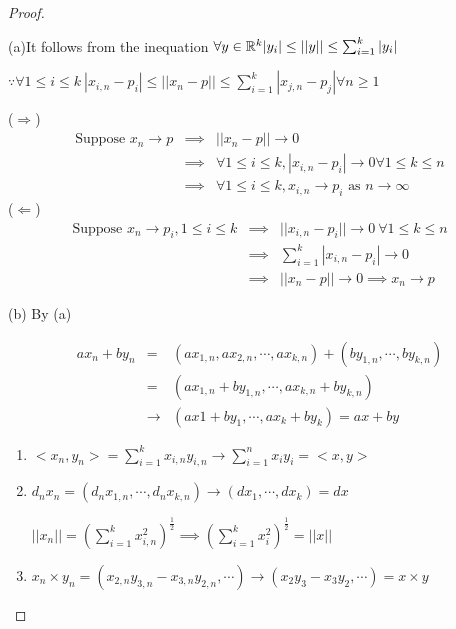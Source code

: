 \begin{proof}$ $

	(a)It follows from the inequation $\forall y \in \mathbb{R}^k |y_i| \leq ||y|| \leq \sum^{k}_{i = 1}|y_i|$
	
	$\because \forall 1 \leq i \leq k ~ |x_{i,n} - p_i| \leq ||x_n - p|| \leq \sum^k_{i=1}|x_{j,n} - p_j| \forall n \geq 1$
	
	($\Rightarrow$) \begin{eqnarray*}
		\text{Suppose } x_n \rightarrow p &\implies & ||x_n - p|| \rightarrow 0\\
		&\implies& \forall 1 \leq i \leq k, |x_{i,n} - p_i| \rightarrow 0 \forall 1 \leq k \leq n\\
		&\implies& \forall 1 \leq i \leq k, x_{i,n} \rightarrow p_i \text{ as } n \rightarrow \infty 
	\end{eqnarray*}
	($\Leftarrow$) 
	\begin{eqnarray*}
		\text{Suppose } x_n \rightarrow p_i, 1 \leq i \leq k &\implies & ||x_{i,n} - p_i|| \rightarrow 0 ~\forall 1 \leq k \leq n\\
		&\implies& \sum^k_{i = 1}|x_{i,n} - p_i| \rightarrow 0 \\
		&\implies& ||x_n - p|| \rightarrow 0 \implies x_n \rightarrow p
	\end{eqnarray*}
	
	(b) By (a)
	
	\begin{eqnarray*}
		ax_n + by_n &=& (ax_{1,n},ax_{2,n},\cdots,ax_{k,n}) + (by_{1,n},\cdots , by_{k,n})\\
		&=& (ax_{1,n} + by_{1,n},\cdots,ax_{k,n} + by_{k,n})\\
		&\rightarrow & (ax1 + by_1,\cdots , ax_k + by_k) = ax + by 
	\end{eqnarray*}
	
	\begin{enumerate}[label = $\bullet$]
		\item $<x_n,y_n> = \sum^k_{i = 1}x_{i,n}y_{i,n} \rightarrow \sum^n_{i = 1}x_iy_i = <x,y>$
		\item $d_nx_n = (d_nx_{1,n},\cdots , d_nx_{k,n}) \rightarrow (dx_1,\cdots,dx_k) = dx$
		
		$||x_n|| = (\sum^k_{i=1} x_{i,n}^2)^{\frac{1}{2}} \implies (\sum^k_{i=1}x_i^2)^{\frac{1}{2}} = ||x||$
		\item $x_n \times y_n = (x_{2,n}y_{3,n} - x_{3,n}y_{2,n},\cdots) \rightarrow (x_2y_3 - x_3y_2 , \cdots) = x \times y$
	\end{enumerate}
\end{proof}

